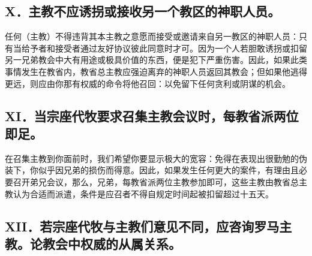 
\subsection{X．主教不应诱拐或接收另一个教区的神职人员。}

任何（主教）不得违背其本主教之意愿而接受或邀请来自另一教区的神职人员：只有当给予者和接受者通过友好协议彼此同意时才可。因为一个人若胆敢诱拐或扣留另一兄弟教会中大有用途或极具价值的东西，便是犯下严重伤害。因此，如果此类事情发生在教省内，教省总主教应强迫离弃的神职人员返回其教会；但如果他逃得更远，则应由你那有权威的命令将他召回：以免留下任何贪利或阴谋的机会。\par


\subsection{XI．当宗座代牧要求召集主教会议时，每教省派两位即足。}

在召集主教到你面前时，我们希望你要显示极大的宽容：免得在表现出很勤勉的伪装下，你似乎因兄弟的损伤而得意。因此，如果发生任何更大的案件，有理由且必要召开弟兄会议，那么，兄弟，每教省派两位主教参加即可，这些主教由教省总主教认为合适而派遣，条件是应召者不得自规定时间起被扣留超过十五天。\par


\subsection{XII．若宗座代牧与主教们意见不同，应咨询罗马主教。论教会中权威的从属关系。}

